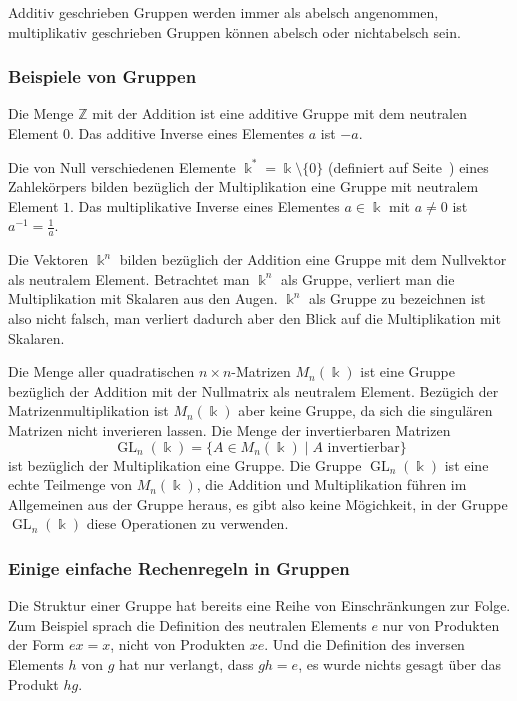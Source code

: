 Additiv geschrieben Gruppen werden immer als abelsch angenommen,
multiplikativ geschrieben Gruppen können abelsch oder nichtabelsch sein.

\subsubsection{Beispiele von Gruppen}

\begin{beispiel}
Die Menge $\mathbb{Z}$ mit der Addition ist eine additive Gruppe mit
dem neutralen Element $0$.
Das additive Inverse eines Elementes $a$ ist $-a$.
\end{beispiel}

\begin{beispiel}
Die von Null verschiedenen Elemente $\Bbbk^*=\Bbbk\setminus\{0\}$ (definiert
auf Seite~\pageref{buch:zahlen:def:bbbk*})
eines Zahlekörpers bilden
bezüglich der Multiplikation eine Gruppe mit neutralem Element $1$.
Das multiplikative Inverse eines Elementes $a\in \Bbbk$ mit $a\ne 0$
ist $a^{-1}=\frac1{a}$.
\end{beispiel}

\begin{beispiel}
Die Vektoren $\Bbbk^n$ bilden bezüglich der Addition eine Gruppe mit
dem Nullvektor als neutralem Element.
Betrachtet man $\Bbbk^n$ als Gruppe, verliert man die Multiplikation
mit Skalaren aus den Augen.
$\Bbbk^n$ als Gruppe zu bezeichnen ist also nicht falsch, man
verliert dadurch aber den Blick auf die Multiplikation mit Skalaren.
\end{beispiel}

\begin{beispiel}
Die Menge aller quadratischen $n\times n$-Matrizen $M_n(\Bbbk)$ ist
eine Gruppe bezüglich der Addition mit der Nullmatrix als neutralem
Element.
Bezügich der Matrizenmultiplikation ist $M_n(\Bbbk)$ aber keine
Gruppe, da sich die singulären Matrizen nicht inverieren lassen.
Die Menge der invertierbaren Matrizen
\[
\operatorname{GL}_n(\Bbbk)
=
\{
A\in M_n(\Bbbk)\;|\; \text{$A$ invertierbar}
\}
\]
ist bezüglich der Multiplikation eine Gruppe.
Die Gruppe $\operatorname{GL}_n(\Bbbk)$ ist eine echte Teilmenge 
von $M_n(\Bbbk)$, die Addition und Multiplikation führen im Allgemeinen
aus der Gruppe heraus, es gibt also keine Mögichkeit, in der Gruppe
$\operatorname{GL}_n(\Bbbk)$ diese Operationen zu verwenden.
\end{beispiel}

\subsubsection{Einige einfache Rechenregeln in Gruppen}
Die Struktur einer Gruppe hat bereits eine Reihe von
Einschränkungen zur Folge.
Zum Beispiel sprach die Definition des neutralen Elements $e$ nur von
Produkten der Form $ex=x$, nicht von Produkten $xe$.
Und die Definition des inversen Elements $h$ von $g$ hat nur
verlangt, dass $gh=e$, es wurde nichts gesagt über das Produkt $hg$.

